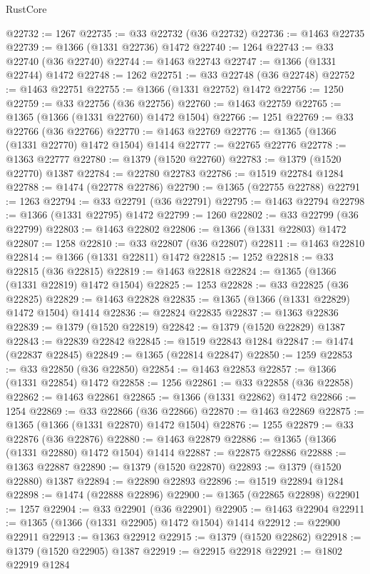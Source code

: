 \begin{lexlean}{RustCore}
\begin{coremodule}
@22732 := 1267
@22735 := @33 @22732 (@36 @22732)
@22736 := @1463 @22735
@22739 := @1366 (@1331 @22736) @1472
@22740 := 1264
@22743 := @33 @22740 (@36 @22740)
@22744 := @1463 @22743
@22747 := @1366 (@1331 @22744) @1472
@22748 := 1262
@22751 := @33 @22748 (@36 @22748)
@22752 := @1463 @22751
@22755 := @1366 (@1331 @22752) @1472
@22756 := 1250
@22759 := @33 @22756 (@36 @22756)
@22760 := @1463 @22759
@22765 := @1365 (@1366 (@1331 @22760) @1472 @1504)
@22766 := 1251
@22769 := @33 @22766 (@36 @22766)
@22770 := @1463 @22769
@22776 := @1365 (@1366 (@1331 @22770) @1472 @1504) @1414
@22777 := @22765 @22776
@22778 := @1363 @22777
@22780 := @1379 (@1520 @22760)
@22783 := @1379 (@1520 @22770) @1387
@22784 := @22780 @22783
@22786 := @1519 @22784 @1284
@22788 := @1474 (@22778 @22786)
@22790 := @1365 (@22755 @22788)
@22791 := 1263
@22794 := @33 @22791 (@36 @22791)
@22795 := @1463 @22794
@22798 := @1366 (@1331 @22795) @1472
@22799 := 1260
@22802 := @33 @22799 (@36 @22799)
@22803 := @1463 @22802
@22806 := @1366 (@1331 @22803) @1472
@22807 := 1258
@22810 := @33 @22807 (@36 @22807)
@22811 := @1463 @22810
@22814 := @1366 (@1331 @22811) @1472
@22815 := 1252
@22818 := @33 @22815 (@36 @22815)
@22819 := @1463 @22818
@22824 := @1365 (@1366 (@1331 @22819) @1472 @1504)
@22825 := 1253
@22828 := @33 @22825 (@36 @22825)
@22829 := @1463 @22828
@22835 := @1365 (@1366 (@1331 @22829) @1472 @1504) @1414
@22836 := @22824 @22835
@22837 := @1363 @22836
@22839 := @1379 (@1520 @22819)
@22842 := @1379 (@1520 @22829) @1387
@22843 := @22839 @22842
@22845 := @1519 @22843 @1284
@22847 := @1474 (@22837 @22845)
@22849 := @1365 (@22814 @22847)
@22850 := 1259
@22853 := @33 @22850 (@36 @22850)
@22854 := @1463 @22853
@22857 := @1366 (@1331 @22854) @1472
@22858 := 1256
@22861 := @33 @22858 (@36 @22858)
@22862 := @1463 @22861
@22865 := @1366 (@1331 @22862) @1472
@22866 := 1254
@22869 := @33 @22866 (@36 @22866)
@22870 := @1463 @22869
@22875 := @1365 (@1366 (@1331 @22870) @1472 @1504)
@22876 := 1255
@22879 := @33 @22876 (@36 @22876)
@22880 := @1463 @22879
@22886 := @1365 (@1366 (@1331 @22880) @1472 @1504) @1414
@22887 := @22875 @22886
@22888 := @1363 @22887
@22890 := @1379 (@1520 @22870)
@22893 := @1379 (@1520 @22880) @1387
@22894 := @22890 @22893
@22896 := @1519 @22894 @1284
@22898 := @1474 (@22888 @22896)
@22900 := @1365 (@22865 @22898)
@22901 := 1257
@22904 := @33 @22901 (@36 @22901)
@22905 := @1463 @22904
@22911 := @1365 (@1366 (@1331 @22905) @1472 @1504) @1414
@22912 := @22900 @22911
@22913 := @1363 @22912
@22915 := @1379 (@1520 @22862)
@22918 := @1379 (@1520 @22905) @1387
@22919 := @22915 @22918
@22921 := @1802 @22919 @1284

\end{coremodule}
\end{lexlean}
